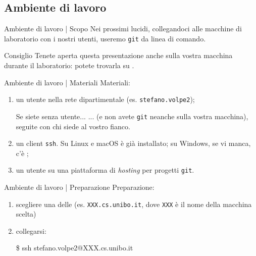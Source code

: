 \documentclass{beamer}
\begin{document}
\subsection{Ambiente di lavoro}
\begin{frame}{Ambiente di lavoro | Scopo}
  Nei prossimi lucidi, collegandoci alle macchine di laboratorio con i nostri
  utenti, useremo \texttt{git} da linea di comando.\pause
  \begin{block}{Consiglio}
    Tenete aperta questa presentazione anche sulla vostra macchina durante il
    laboratorio: potete trovarla su
    \href{https://csunibo.github.io/lab}{}.
  \end{block}
\end{frame}

\begin{frame}{Ambiente di lavoro | Materiali}
  Materiali:
  \begin{enumerate}
    \item<1->un utente nella rete dipartimentale (es. \texttt{stefano.volpe2});
      \begin{alertblock}{Se siete senza utente...}
        ... (e non avete \texttt{git} neanche sulla vostra macchina), seguite con
        chi siede al vostro fianco.
      \end{alertblock}\pause
    \item<2->un client \texttt{ssh}. Su Linux e macOS è già installato; su
      Windows, se vi manca, c'è
      \href{https://www.chiark.greenend.org.uk/~sgtatham/putty/latest.html}{};
    \item<3->un utente su una piattaforma di \emph{hosting} per progetti
      \texttt{git}.
  \end{enumerate}
\end{frame}

\begin{frame}{Ambiente di lavoro | Preparazione}
  Preparazione:
  \begin{enumerate}
    \item<1->scegliere una delle \href{https://disi.unibo.it/it/dipartimento/servizi-tecnici-e-amministrativi/servizi-informatici/accesso-remoto}{} (es. \texttt{XXX.cs.unibo.it}, dove \texttt{XXX} è il
      nome della macchina scelta)
    \item<2-> collegarsi:
      \begin{semiverbatim}
        \$ ssh stefano.volpe2@XXX.cs.unibo.it
      \end{semiverbatim}
  \end{enumerate}
\end{frame}
\end{document}
